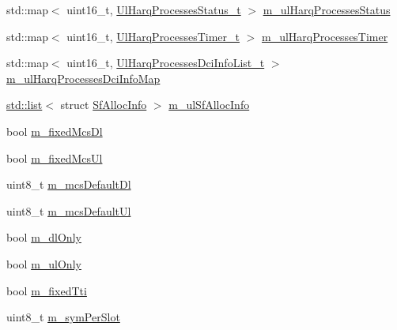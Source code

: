 \begin{DoxyCompactItemize}
\item 
std\+::map$<$ uint16\+\_\+t, \hyperlink{classns3_1_1MmWaveFlexTtiMacScheduler_ad0ab2d61606f26e8ceaf67ee115d20f0}{Ul\+Harq\+Processes\+Status\+\_\+t} $>$ \hyperlink{classns3_1_1MmWaveFlexTtiMacScheduler_af728e6ddeaaf55536ca842682904d64a}{m\+\_\+ul\+Harq\+Processes\+Status}
\item 
std\+::map$<$ uint16\+\_\+t, \hyperlink{classns3_1_1MmWaveFlexTtiMacScheduler_a87460d77cb0a37a358ca8db3149222bf}{Ul\+Harq\+Processes\+Timer\+\_\+t} $>$ \hyperlink{classns3_1_1MmWaveFlexTtiMacScheduler_a27a2652523d0e61fa7da08a7d43b84a1}{m\+\_\+ul\+Harq\+Processes\+Timer}
\item 
std\+::map$<$ uint16\+\_\+t, \hyperlink{classns3_1_1MmWaveFlexTtiMacScheduler_a74be63957bd21643f909fc2cb7867c04}{Ul\+Harq\+Processes\+Dci\+Info\+List\+\_\+t} $>$ \hyperlink{classns3_1_1MmWaveFlexTtiMacScheduler_ad18cf8a17f05488fc679bd891175864f}{m\+\_\+ul\+Harq\+Processes\+Dci\+Info\+Map}
\item 
\hyperlink{openflow-interface_8h_afd9bcfa176617760671b67580f536fa7}{std\+::list}$<$ struct \hyperlink{structns3_1_1SfAllocInfo}{Sf\+Alloc\+Info} $>$ \hyperlink{classns3_1_1MmWaveFlexTtiMacScheduler_a79bb85066aa83355a90eeebb5881b542}{m\+\_\+ul\+Sf\+Alloc\+Info}
\item 
bool \hyperlink{classns3_1_1MmWaveFlexTtiMacScheduler_a310495cea515a335d1dfcc4d623b9b0a}{m\+\_\+fixed\+Mcs\+Dl}
\item 
bool \hyperlink{classns3_1_1MmWaveFlexTtiMacScheduler_adcb65237e784d0154cc892e9eafdc883}{m\+\_\+fixed\+Mcs\+Ul}
\item 
uint8\+\_\+t \hyperlink{classns3_1_1MmWaveFlexTtiMacScheduler_ae439c9faae5c2544276b639aa2778521}{m\+\_\+mcs\+Default\+Dl}
\item 
uint8\+\_\+t \hyperlink{classns3_1_1MmWaveFlexTtiMacScheduler_a9f55a65641298174b3674300bc45f5a0}{m\+\_\+mcs\+Default\+Ul}
\item 
bool \hyperlink{classns3_1_1MmWaveFlexTtiMacScheduler_a41cc41f208cd4be60b44da4668a75c7b}{m\+\_\+dl\+Only}
\item 
bool \hyperlink{classns3_1_1MmWaveFlexTtiMacScheduler_ac9a7f43505a88bb77adc0e3845e42a83}{m\+\_\+ul\+Only}
\item 
bool \hyperlink{classns3_1_1MmWaveFlexTtiMacScheduler_aac44befc273f7bdb0f0be0efc3d05f34}{m\+\_\+fixed\+Tti}
\item 
uint8\+\_\+t \hyperlink{classns3_1_1MmWaveFlexTtiMacScheduler_aa911d95e2956fcccca151a7353b8d42f}{m\+\_\+sym\+Per\+Slot}
\end{DoxyCompactItemize}
